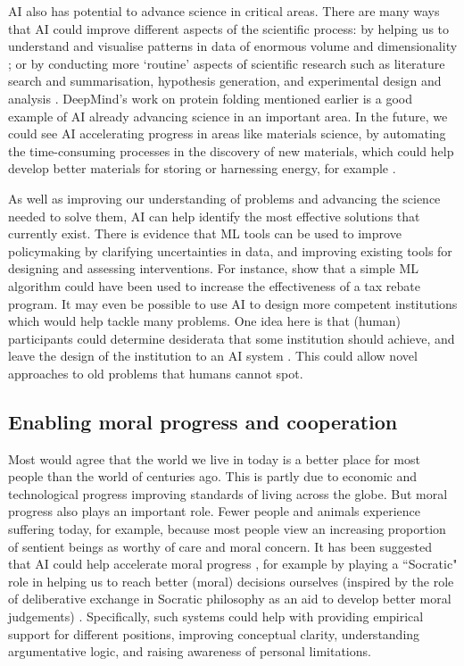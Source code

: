 \documentclass{article}
\begin{document}
AI also has potential to advance science in critical areas. There are many ways that AI could improve different aspects of the scientific process: by helping us to understand and visualise patterns in data of enormous volume and dimensionality \citep{mjolsness_machine_2001,ourmazd_science_2020}; or by conducting more ‘routine’ aspects of scientific research such as literature search and summarisation, hypothesis generation, and experimental design and analysis \citep{gil_amplify_2014}. DeepMind’s work on protein folding mentioned earlier is a good example of AI already advancing science in an important area. In the future, we could see AI accelerating progress in areas like materials science, by automating the time-consuming processes in the discovery of new materials, which could help develop better materials for storing or harnessing energy, for example \citep{rolnick_tackling_2019}.

As well as improving our understanding of problems and advancing the science needed to solve them, AI can help identify the most effective solutions that currently exist. There is evidence that ML tools can be used to improve policymaking by clarifying uncertainties in data, and improving existing tools for designing and assessing interventions\citep{rolnick_tackling_2019}. For instance, \citet{andini_targeting_2018} show that a simple ML algorithm could have been used to increase the effectiveness of a tax rebate program. It may even be possible to use AI to design more competent institutions which would help tackle many problems. One idea here is that (human) participants could determine desiderata that some institution should achieve, and leave the design of the institution to an AI system \citep{dafoe_open_2020}. This could allow novel approaches to old problems that humans cannot spot.

\subsection{Enabling moral progress and cooperation}

Most would agree that the world we live in today is a better place for most people than the world of centuries ago. This is partly due to economic and technological progress improving standards of living across the globe. But moral progress also plays an important role. Fewer people and animals experience suffering today, for example, because most people view an increasing proportion of sentient beings as worthy of care and moral concern. It has been suggested that AI could help accelerate moral progress \citep{boddington_ai_2021}, for example by playing a ``Socratic" role in helping us to reach better (moral) decisions ourselves (inspired by the role of deliberative exchange in Socratic philosophy as an aid to develop better moral judgements) \citep{lara_artificial_2020}. Specifically, such systems could help with providing empirical support for different positions, improving conceptual clarity, understanding argumentative logic, and raising awareness of personal limitations.
\end{document}
